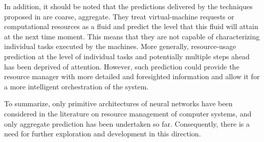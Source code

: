 In addition, it should be noted that the predictions delivered by the techniques
proposed in \cite{cao2014, dabbagh2015, ismaeel2015} are coarse, aggregate. They
treat virtual-machine requests or computational resources as a fluid and predict
the level that this fluid will attain at the next time moment. This means that
they are not capable of characterizing individual tasks executed by the
machines. More generally, resource-usage prediction at the level of individual
tasks and potentially multiple steps ahead has been deprived of attention.
However, such prediction could provide the resource manager with more detailed
and foresighted information and allow it for a more intelligent orchestration of
the system.

To summarize, only primitive architectures of neural networks have been
considered in the literature on resource management of computer systems, and
only aggregate prediction has been undertaken so far. Consequently, there is a
need for further exploration and development in this direction.

